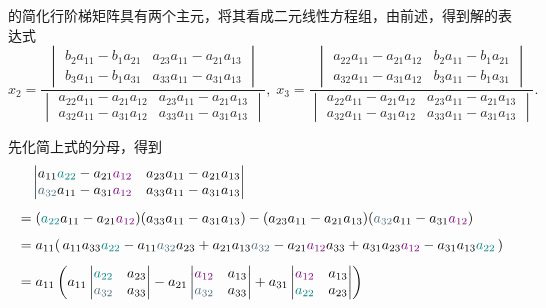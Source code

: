 \documentclass[10pt,openany]{article}
\theoremstyle{thmstyle} %
\theoremstyle{defstyle} %
\theoremstyle{prostyle} %
\theoremstyle{exastyle}
\theoremstyle{remstyle}
\begin{document}
的简化行阶梯矩阵具有两个主元，将其看成二元线性方程组，由前述，得到解的表达式
\[ x_2=\frac{\begin{vmatrix}
		b_2 a_{11} - b_1 a_{21} & a_{23} a_{11} - a_{21} a_{13} \\ b_3 a_{11} - b_1 a_{31} & a_{33} a_{11} - a_{31} a_{13}
\end{vmatrix}}{\begin{vmatrix}
		a_{22} a_{11} - a_{21} a_{12} & a_{23} a_{11} - a_{21} a_{13} \\ a_{32} a_{11} - a_{31} a_{12} & a_{33} a_{11} - a_{31} a_{13}
\end{vmatrix}}, \; x_3=\frac{\begin{vmatrix}
		a_{22} a_{11} - a_{21} a_{12} & b_2 a_{11} - b_1 a_{21} \\ a_{32} a_{11} - a_{31} a_{12} & b_3 a_{11} - b_1 a_{31}
\end{vmatrix}}{\begin{vmatrix}
a_{22} a_{11} - a_{21} a_{12} & a_{23} a_{11} - a_{21} a_{13} \\ a_{32} a_{11} - a_{31} a_{12} & a_{33} a_{11} - a_{31} a_{13}
\end{vmatrix}}. \]

先化简上式的分母，得到
\begin{align*}
	& \quad \begin{vmatrix}
		a_{11} {\color{teal} a_{22}} - a_{21} {\color{violet} a_{12}} & a_{23} a_{11} - a_{21} a_{13} \\
		{\color{cyan!40!black} a_{32}} a_{11} - a_{31} {\color{violet} a_{12}} & a_{33} a_{11} - a_{31} a_{13}
	\end{vmatrix} \\[1ex]
	&= ({\color{teal} a_{22}} a_{11} - a_{21} {\color{violet} a_{12}})(a_{33} a_{11} - a_{31} a_{13}) - (a_{23} a_{11} - a_{21} a_{13})({\color{cyan!40!black} a_{32}} a_{11} - a_{31} {\color{violet} a_{12}}) \\[1ex]
	&= a_{11}(\, a_{11} a_{33} {\color{teal} a_{22}}- a_{11} {\color{cyan!40!black} a_{32}} a_{23}  + a_{21} a_{13} {\color{cyan!40!black} a_{32}} - a_{21} {\color{violet} a_{12}} a_{33} + a_{31} a_{23} {\color{violet} a_{12}} - a_{31} a_{13}  {\color{teal} a_{22}}   \,) \\[1ex]
	&= a_{11} \left( a_{11} \begin{vmatrix}
{\color{teal} a_{22}} & a_{23} \\
{\color{cyan!40!black} a_{32}} & a_{33}
	\end{vmatrix}
	- a_{21} \begin{vmatrix}
		{\color{violet} a_{12}} & a_{13} \\
		{\color{cyan!40!black} a_{32}} & a_{33} 
	\end{vmatrix}
	+ a_{31} \begin{vmatrix}
		{\color{violet} a_{12}} & a_{13} \\
		{\color{teal} a_{22}} & a_{23} 
	\end{vmatrix} \right)
\end{align*}
\end{document}
